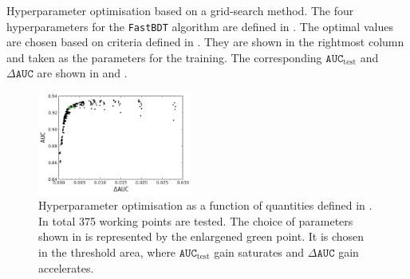 \begin{table}[htbp!]
    \centering
    \caption{\label{tab:grid_search}Hyperparameter optimisation based on a grid-search method.
    The four hyperparameters for the \texttt{FastBDT} algorithm are defined in .
    The optimal values are chosen based on criteria defined in .
    They are shown in the rightmost column and taken as the parameters for the training.
    The corresponding $\mathtt{AUC}_{\mathrm{test}}$ and $\Delta \mathtt{AUC}$ are shown in  and .
    }
    
\end{table}

\begin{figure}[htbp!]
    \centering
    \includegraphics[width=0.45\textwidth]{figures/continuum_suppression/hyperpar_optimisation.png}
    \caption{\label{fig:hyper_param}Hyperparameter optimisation as a function of quantities defined in .
    In total 375 working points are tested.
    The choice of parameters shown in  is represented by the enlargened green point.
    It is chosen in the threshold area, where $\mathtt{AUC}_{\mathrm{test}}$ gain saturates and $\Delta \mathtt{AUC}$ gain accelerates.
    }
\end{figure}

